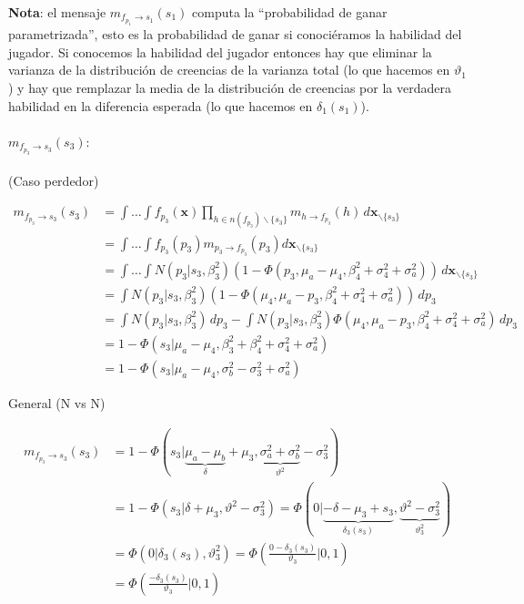 \documentclass[11pt,twoside,spanish]{report} %
\begin{document}
\textbf{Nota}: el mensaje $m_{f_{p_1} \rightarrow s_1}(s_1)$ computa la ``probabilidad de ganar parametrizada'', esto es la probabilidad de ganar si conoci\'eramos la habilidad del jugador. Si conocemos la habilidad del jugador entonces hay que eliminar la varianza de la distribuci\'on de creencias de la varianza total (lo que hacemos en $\vartheta_1$) y hay que remplazar la media de la distribuci\'on de creencias por la verdadera habilidad en la diferencia esperada (lo que hacemos en $\delta_1(s_1)$).


\paragraph{$m_{f_{p_3} \rightarrow s_3}(s_3):$}(Caso perdedor)

\begin{equation}
	\begin{split}
		m_{f_{p_3} \rightarrow s_3}(s_3) & = \int \dots \int f_{p_3}(\textbf{x}) \prod_{h \in n(f_{p_3}) \backslash \{s_3\} } m_{h \rightarrow f_{p_3}}(h) \, d\textbf{x}_{\backslash \{s_3\} }  \\
		&= \int \dots \int f_{p_3}(p_3)m_{p_3 \rightarrow f_{p_3}}(p_3) d\textbf{x}_{\backslash \{s_3\} }  \\
		&= \int \dots \int N(p_3| s_3, \beta_3^2) (1 - \Phi(p_3, \mu_a  - \mu_4, \beta_4^2 + \sigma_4^2 + \sigma_a^2)) \, d\textbf{x}_{\backslash \{s_3\} }\\
		& = \int N(p_3| s_3, \beta_3^2) (1 - \Phi(\mu_4, \mu_a  - p_3, \beta_4^2 + \sigma_4^2 + \sigma_a^2)) \, dp_3 \\
		&=\int N(p_3| s_3, \beta_3^2) \, dp_3 -  \int N(p_3| s_3, \beta_3^2)  \Phi(\mu_4, \mu_a  - p_3, \beta_4^2 + \sigma_4^2 + \sigma_a^2) \, dp_3 \\
		&=1 - \Phi\left(s_3| \mu_a-  \mu_4, \beta_3^2 +\beta_4^2 + \sigma_4^2 + \sigma_a^2 \right)\\
		&=1 - \Phi\left(s_3| \mu_a-  \mu_4, \sigma_b^2-\sigma_3^2 + \sigma_a^2 \right)
	\end{split}
\end{equation}

General (N vs N)

\begin{equation}
	\begin{split}
		m_{f_{p_3} \rightarrow s_3}(s_3) & = 1 - \Phi(s_3| \underbrace{\mu_a-\mu_b}_{\delta}+\mu_3, \underbrace{\sigma_a^2 + \sigma_b^2}_{\vartheta^2} - \sigma_3^2 ) \\
		& = 1 - \Phi(s_3| \delta+\mu_3, \vartheta^2- \sigma_3^2 ) = \Phi(0| \underbrace{-\delta-\mu_3+s_3}_{\delta_3(s_3)}, \underbrace{\vartheta^2- \sigma_3^2}_{\vartheta_3^2}) \\
		& = \Phi(0|\delta_3(s_3),\vartheta_3^2)  = \Phi\left(\frac{0-\delta_3(s_3)}{\vartheta_3}|0,1\right) \\
		& = \Phi\left(\frac{-\delta_3(s_3)}{\vartheta_3}|0,1\right)
	\end{split}
\end{equation}
\end{document}
